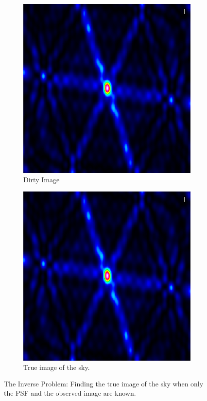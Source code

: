 \begin{figure}[h!]
	\centering
	\begin{subfigure}[b]{0.4\linewidth}
		\includegraphics[width=\linewidth]{./chapters/01.intro/img/PSF.png}
		\caption{Dirty Image}
	\end{subfigure}
	\begin{subfigure}[b]{0.4\linewidth}
		\includegraphics[width=\linewidth]{./chapters/01.intro/img/PSF.png}
		\caption{True image of the sky.}
	\end{subfigure}
	\caption{The Inverse Problem: Finding the true image of the sky when only the PSF and the observed image are known.}
	\label{intro:deconvolve}
\end{figure}


